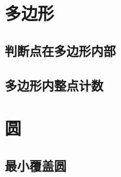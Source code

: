 \documentclass[openany, a4paper, 10pt]{book}
\begin{document}
\begin{spacing}{1.1}
		\section{多边形}
			\subsection{判断点在多边形内部}
				
			\subsection{多边形内整点计数}
				
		\section{圆}
			\subsection{最小覆盖圆}
				

\end{spacing}
\end{document}
